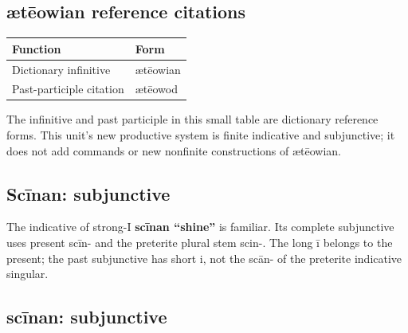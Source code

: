 \subsection*{ætēowian reference citations}

\par\begingroup
\fontsize{10.5}{13.2}\selectfont
\setlength{\LTleft}{0pt}\setlength{\LTright}{\fill}
\noindent
\begin{tabular}{@{}>{\raggedright\arraybackslash}p{79.47mm}>{\raggedright\arraybackslash}p{41.72mm}@{}}
\toprule
\textbf{Function} & \textbf{Form} \\
\midrule
Dictionary infinitive & ætēowian \\
Past-participle citation & ætēowod \\
\bottomrule
\end{tabular}
\par\endgroup

The infinitive and past participle in this small table are dictionary reference forms. This unit’s new productive system is finite indicative and subjunctive; it does not add commands or new nonfinite constructions of ætēowian.

\subsection*{Scīnan: subjunctive}

The indicative of strong-I \textbf{scīnan “shine”} is familiar. Its complete subjunctive uses present scīn- and the preterite plural stem scin-. The long ī belongs to the present; the past subjunctive has short i, not the scān- of the preterite indicative singular.

\subsection*{scīnan: subjunctive}

